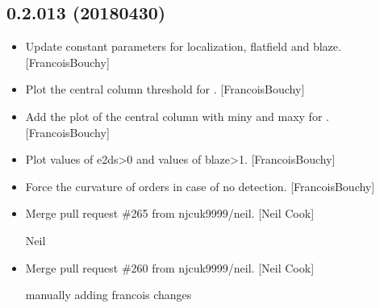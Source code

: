\documentclass[a4paper,10pt,english]{report}
\begin{document}
\subsection{0.2.013 (2018\sphinxhyphen{}04\sphinxhyphen{}30)}
\label{\detokenize{misc/changelog:id468}}\begin{itemize}
\item {} 
Update constant parameters for localization, flat\sphinxhyphen{}field and blaze.
{[}FrancoisBouchy{]}

\item {} 
Plot the central column threshold for . {[}FrancoisBouchy{]}

\item {} 
Add the plot of the central column with miny and maxy for .
{[}FrancoisBouchy{]}

\item {} 
Plot values of e2ds\textgreater{}0 and values of blaze\textgreater{}1. {[}FrancoisBouchy{]}

\item {} 
Force the curvature of orders in case of no detection.
{[}FrancoisBouchy{]}

\item {} 
Merge pull request \#265 from njcuk9999/neil. {[}Neil Cook{]}

Neil

\item {} 
Merge pull request \#260 from njcuk9999/neil. {[}Neil Cook{]}

manually adding francois changes

\end{itemize}
\end{document}

